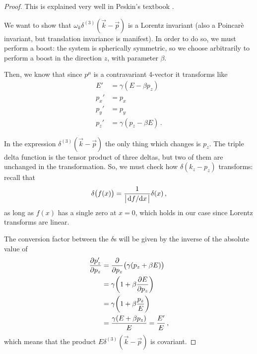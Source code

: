 \documentclass[main.tex]{subfiles}
\begin{document}
\begin{proof}
This is explained very well in Peskin's textbook \cite[section 3.5]{peskinConceptsElementaryParticle2019}.

We want to show that \(\omega_{k}  \delta^{(3)} (\vec{k} - \vec{p})\) is a Lorentz invariant (also a Poincarè invariant, but translation invariance is manifest). In order to do so, we must perform a boost: the system is spherically symmetric, so we choose arbitrarily to perform a boost in the direction \(z\), with parameter \(\beta \). 

Then, we know that since \(p^{\mu }\) is a contravariant 4-vector it transforms like 
%
\begin{subequations}
\begin{align}
E' &= \gamma (E - \beta p_{z}) \\
p_{x}' &= p_{x} \\
p_{y}' &= p_{y} \\
p_{z}' &= \gamma (p_{z} - \beta E)
\,.
\end{align}
\end{subequations}

In the expression \(\delta^{(3)} (\vec{k} - \vec{p})\) the only thing which changes is \(p_{z}\). The triple delta function is the tensor product of three deltas, but two of them are unchanged in the transformation.
So, we must check how \(\delta (k_{z} - p_{z})\) transforms: recall that 
%
\begin{align}
\delta \qty(f(x)) = \frac{1}{\abs{\dv*{f}{x}}} \delta (x) 
\,,
\end{align}
%
as long as \(f(x)\) has a single zero at \(x=0\), which holds in our case since Lorentz transforms are linear.

The conversion factor between the \(\delta \)s will be given by the inverse of the absolute value of
%
\begin{subequations}
\begin{align}
\pdv{p_{z}'}{p_{z}} &= \pdv{}{p_{z}} \qty(\gamma (p_{z} + \beta E))  \\
&= \gamma \qty(1 + \beta \pdv{E}{p_{z}})  \\
&= \gamma \qty(1 + \beta \frac{p_{z}}{E})  \\
&= \frac{\gamma \qty(E + \beta p_z)}{E} = \frac{E'}{E}
\,,
\end{align}
\end{subequations}
%
which means that the product \(E \delta^{(3)} (\vec{k} - \vec{p})\) is covariant. 
\end{proof}
\end{document}
